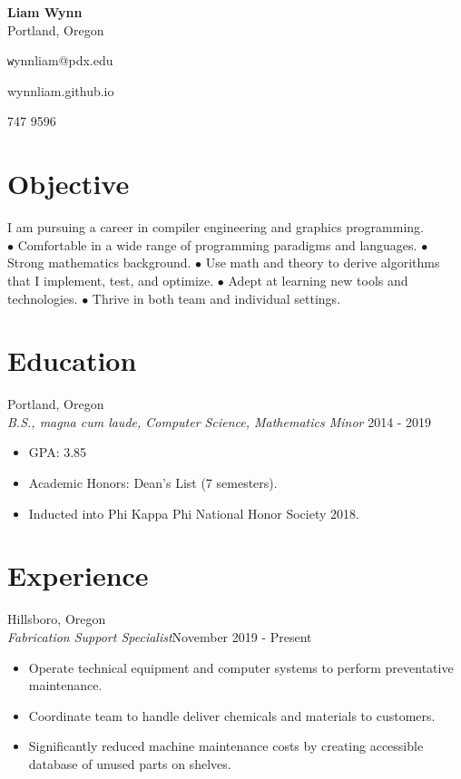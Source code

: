 \documentclass[12pt]{article}
\newcommand\textline[4][t]{%
  \par\smallskip\noindent\parbox[#1]{.333\textwidth}{\raggedright\texttt#2}%
  \parbox[#1]{.333\textwidth}{\centering#3}%
  \parbox[#1]{.333\textwidth}{\raggedleft#4}\par\smallskip%
}
\begin{document}
	\begin{center}
		\noindent \Large{\textbf{Liam Wynn}}\\
		\noindent \small{Portland, Oregon}
	\end{center}

	\begin{flushleft}
	\textline[t]{wynnliam@pdx.edu}{wynnliam.github.io}{503 747 9596}
	\noindent\makebox[\linewidth]{\rule{\textwidth}{0.4pt}}
	\end{flushleft}

	\section* {Objective}
	I am pursuing a career in compiler engineering and graphics programming. \\

	 $\bullet$ Comfortable in a wide range of programming paradigms and languages. $\bullet$ Strong mathematics background.  $\bullet$ Use math and theory to derive algorithms that I implement, test, and optimize. $\bullet$ Adept at learning new tools and technologies. $\bullet$ Thrive in both team and individual settings.

	\section*{Education}
	\hfill Portland, Oregon \\
 	\noindent \emph {B.S., magna cum laude, Computer Science, Mathematics Minor} \hfill 2014 - 2019
	\begin{itemize}[noitemsep]
		\item GPA: 3.85
		\item Academic Honors: Dean's List (7 semesters).
		\item Inducted into Phi Kappa Phi National Honor Society 2018.
	\end{itemize}

	\section*{Experience}
	\hfill Hillsboro, Oregon\\
	\noindent \emph{Fabrication Support Specialist}\hfill November 2019 - Present
	\begin{itemize}[noitemsep]
		\item Operate technical equipment and computer systems to perform preventative maintenance.
		\item Coordinate team to handle deliver chemicals and materials to customers.
		\item Significantly reduced machine maintenance costs by creating accessible database of unused parts on shelves.
	\end{itemize}
\end{document}
